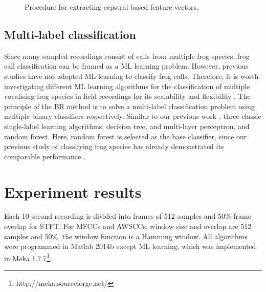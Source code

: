 \begin{figure}[htb!] %
\caption[Spectral clustering for cepstral feature extraction]{Procedure for extracting cepstral based feature vectors.}
\label{fig:spectralClustering} 
\end{figure}





\subsection{Multi-label classification} 
Since many sampled recordings consist of calls from multiple frog species, frog call classification can be framed as a ML learning problem. However, previous studies have not adopted ML learning to classify frog calls. Therefore, it is worth investigating different ML learning algorithms for the classification of multiple vocalising frog species in field recordings for its scalability and flexibility \citep{read2011classifier}. The principle of the BR method is to solve a multi-label classification problem using multiple binary classifiers respectively. Similar to our previous work \citep{zhang2016using}, 
three classic single-label learning algorithms: decision tree, and multi-layer perceptron, and random forest. Here, random forest is selected as the base classifier, since our previous study of classifying frog species has already demonstrated its comparable performance \citep{xie2016acoustic}. 

\section{Experiment results}
Each 10-second recording is divided into frames of 512 samples and 50\% frame overlap for STFT. For MFCCs and AWSCCs, window size and overlap are 512 samples and 50\%, the window function is a Hamming window. All algorithms were programmed in Matlab 2014b except ML learning, which was implemented in Meka 1.7.7\footnote[4]{http://meka.sourceforge.net/}. 







